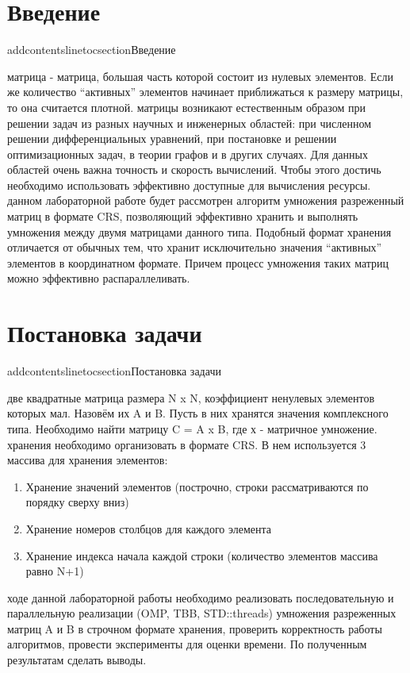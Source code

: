 \documentclass{report}
\begin{document}
\section*{Введение}
addcontentsline{toc}{section}{Введение}

 матрица - матрица, большая часть которой состоит из нулевых элементов. Если же количество “активных” элементов начинает приближаться к размеру матрицы, то она считается плотной.
 матрицы возникают естественным образом при решении задач из разных научных и инженерных областей: при численном решении дифференциальных уравнений, при постановке и решении оптимизационных задач, в теории графов и в других случаях. Для данных областей очень важна точность и скорость вычислений. Чтобы этого достичь необходимо использовать эффективно доступные для вычисления ресурсы.
 данном лабораторной работе будет рассмотрен алгоритм умножения разреженный матриц в формате CRS, позволяющий эффективно хранить и выполнять умножения между двумя матрицами данного типа. Подобный формат хранения отличается от обычных тем, что хранит исключительно значения “активных” элементов в координатном формате. Причем процесс умножения таких матриц можно эффективно распараллеливать. 

\newpage
\section*{Постановка задачи}
addcontentsline{toc}{section}{Постановка задачи}

 две квадратные матрица размера N x N, коэффициент ненулевых элементов которых мал. Назовём их A и B. Пусть в них хранятся значения комплексного типа. Необходимо найти матрицу C = A x B, где х - матричное умножение. 
 хранения необходимо организовать в формате CRS. В нем используется 3 массива для хранения элементов:
\begin{enumerate}
\item Хранение значений элементов (построчно, строки рассматриваются по порядку сверху вниз)
\item Хранение номеров столбцов для каждого элемента
\item Хранение индекса начала каждой строки (количество элементов массива равно N+1)
\end{enumerate}
 ходе данной лабораторной работы необходимо реализовать последовательную и параллельную реализации (OMP, TBB, STD::threads) умножения разреженных матриц A и B в строчном формате хранения, проверить корректность работы алгоритмов, провести эксперименты для оценки времени. По полученным результатам сделать выводы.
\end{document}
